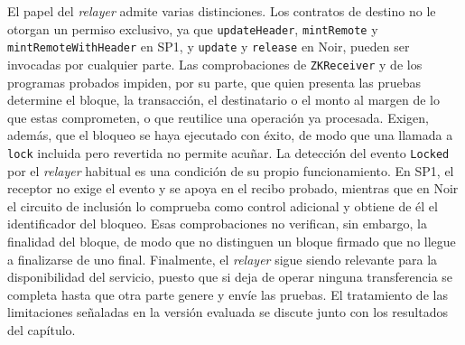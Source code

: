 El papel del \textit{relayer} admite varias distinciones. Los contratos de
destino no le otorgan un permiso exclusivo, ya que \lstinline|updateHeader|,
\lstinline|mintRemote| y \lstinline|mintRemoteWithHeader| en SP1, y \lstinline|update| y
\lstinline|release| en Noir, pueden ser invocadas por cualquier parte. Las comprobaciones de \texttt{ZKReceiver} y de los programas probados impiden, por su parte,
que quien presenta las pruebas determine el bloque, la transacción, el destinatario o el monto al
margen de lo que estas comprometen, o que reutilice una operación ya procesada. Exigen, además,
que el bloqueo se haya ejecutado con éxito, de modo que una llamada a \texttt{lock} incluida pero
revertida no permite acuñar. La detección del evento \texttt{Locked} por el \textit{relayer}
habitual es una condición de su propio funcionamiento. En SP1, el receptor no exige el evento y se
apoya en el recibo probado, mientras que en Noir el circuito de inclusión lo comprueba como control
adicional y obtiene de él el identificador del bloqueo. Esas comprobaciones no verifican, sin embargo, la
finalidad del bloque, de modo que no distinguen un bloque firmado que no llegue a finalizarse de
uno final.
Finalmente, el \textit{relayer} sigue siendo relevante para la disponibilidad del servicio, puesto
que si deja de operar ninguna transferencia se completa hasta que otra parte genere y envíe las
pruebas. El tratamiento de las limitaciones señaladas en la versión evaluada
se discute junto con los resultados del capítulo.
